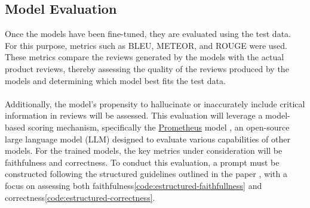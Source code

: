 \subsection{Model Evaluation}
Once the models have been fine-tuned, they are evaluated using the test data. For this purpose, metrics such as BLEU, METEOR, and ROUGE were used. These metrics compare the reviews generated by the models with the actual product reviews, thereby assessing the quality of the reviews produced by the models and determining which model best fits the test data.
\\\\
Additionally, the model's propensity to hallucinate or inaccurately include critical information in reviews will be assessed. This evaluation will leverage a model-based scoring mechanism, specifically the \href{https://huggingface.co/prometheus-eval/prometheus-7b-v2.0}{Prometheus} model \cite{kim2024prometheus2opensource}, an open-source large language model (LLM) designed to evaluate various capabilities of other models. For the trained models, the key metrics under consideration will be faithfulness and correctness. To conduct this evaluation, a prompt must be constructed following the structured guidelines outlined in the paper \cite{kim2024prometheus2opensource}, with a focus on assessing both faithfulness\ref{code:estructured-faithfullness} and correctness\ref{code:estructured-correctness}.

